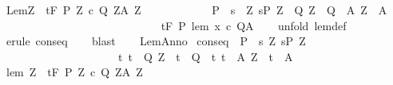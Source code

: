 \begin{isabellebody}
\endisatagproof
{\isafoldproof}%
%
\isadelimproof
\isanewline
%
\endisadelimproof
\isanewline
\isanewline
{}\isamarkupfalse%
\ Lem{\isacharcolon}{\isachardoublequoteopen}{\isasymlbrakk}{\isasymforall}Z{\isachardot}\ {\isasymGamma}{\isacharcomma}{\isasymTheta}\ {\isasymturnstile}\isactrlsub t\isactrlbsub {\isacharslash}F\isactrlesub \ {\isacharparenleft}P{\isacharprime}\ Z{\isacharparenright}\ c\ {\isacharparenleft}Q{\isacharprime}\ Z{\isacharparenright}{\isacharcomma}{\isacharparenleft}A{\isacharprime}\ Z{\isacharparenright}{\isacharsemicolon}\isanewline
\ \ \ \ \ \ \ \ \ \ \ \ P\ {\isasymsubseteq}\ {\isacharbraceleft}s{\isachardot}\ {\isasymexists}\ Z{\isachardot}\ s{\isasymin}P{\isacharprime}\ Z\ {\isasymand}\ {\isacharparenleft}Q{\isacharprime}\ Z\ {\isasymsubseteq}\ Q{\isacharparenright}\ {\isasymand}\ {\isacharparenleft}A{\isacharprime}\ Z\ {\isasymsubseteq}\ A{\isacharparenright}{\isacharbraceright}{\isasymrbrakk}\isanewline
\ \ \ \ \ \ \ \ \ \ \ \ \ \ {\isasymLongrightarrow}\isanewline
\ \ \ \ \ \ \ \ \ \ \ \ \ \ {\isasymGamma}{\isacharcomma}{\isasymTheta}{\isasymturnstile}\isactrlsub t\isactrlbsub {\isacharslash}F\isactrlesub \ P\ {\isacharparenleft}lem\ x\ c{\isacharparenright}\ Q{\isacharcomma}A{\isachardoublequoteclose}\isanewline
%
\isadelimproof
\ \ %
\endisadelimproof
%
\isatagproof
{}\isamarkupfalse%
\ {\isacharparenleft}unfold\ lem{\isacharunderscore}def{\isacharparenright}\ \isanewline
\ \ \isamarkupfalse%
\ {\isacharparenleft}erule\ conseq{\isacharparenright}\isanewline
\ \ \isamarkupfalse%
\ blast\isanewline
\ \ \isamarkupfalse%
%
\endisatagproof
{\isafoldproof}%
%
\isadelimproof
\isanewline
%
\endisadelimproof
\isanewline
\isanewline
{}\isamarkupfalse%
\ LemAnno{\isacharcolon}\isanewline
{}\ conseq{\isacharcolon}\ \ {\isachardoublequoteopen}P\ {\isasymsubseteq}\ {\isacharbraceleft}s{\isachardot}\ {\isasymexists}Z{\isachardot}\ s{\isasymin}P{\isacharprime}\ Z\ {\isasymand}\ \isanewline
\ \ \ \ \ \ \ \ \ \ \ \ \ \ \ \ \ \ \ \ \ {\isacharparenleft}{\isasymforall}t{\isachardot}\ t\ {\isasymin}\ Q{\isacharprime}\ Z\ {\isasymlongrightarrow}\ t\ {\isasymin}\ Q{\isacharparenright}\ {\isasymand}\ {\isacharparenleft}{\isasymforall}t{\isachardot}\ t\ {\isasymin}\ A{\isacharprime}\ Z\ {\isasymlongrightarrow}\ t\ {\isasymin}\ A{\isacharparenright}{\isacharbraceright}{\isachardoublequoteclose}\isanewline
{}\ lem{\isacharcolon}\ {\isachardoublequoteopen}{\isasymforall}Z{\isachardot}\ {\isasymGamma}{\isacharcomma}{\isasymTheta}\ {\isasymturnstile}\isactrlsub t\isactrlbsub {\isacharslash}F\isactrlesub \ {\isacharparenleft}P{\isacharprime}\ Z{\isacharparenright}\ c\ {\isacharparenleft}Q{\isacharprime}\ Z{\isacharparenright}{\isacharcomma}{\isacharparenleft}A{\isacharprime}\ Z{\isacharparenright}{\isachardoublequoteclose}\isanewline

\end{isabellebody}
